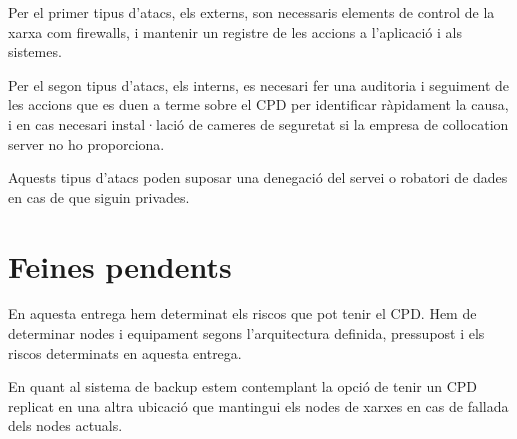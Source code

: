 \documentclass[a4paper, 11pt]{article}
\begin{document}
Per el primer tipus d'atacs, els externs, son necessaris elements de control de la xarxa com firewalls, i mantenir un registre de les accions a l'aplicació i als sistemes. 

Per el segon tipus d'atacs, els interns, es necesari fer una auditoria i seguiment de les accions que es duen a terme sobre el CPD per identificar ràpidament la causa, i en cas necesari instal·lació de cameres de seguretat si la empresa de collocation server no ho proporciona.

Aquests tipus d'atacs poden suposar una denegació del servei o robatori de dades en cas de que siguin privades.


\section{Feines pendents}
En aquesta entrega hem determinat els riscos que pot tenir el CPD. Hem de determinar nodes i equipament segons l'arquitectura definida, pressupost i els riscos determinats en aquesta entrega.

En quant al sistema de backup estem contemplant la opció de tenir un CPD replicat en una altra ubicació que mantingui els nodes de xarxes en cas de fallada dels nodes actuals.
\end{document}
